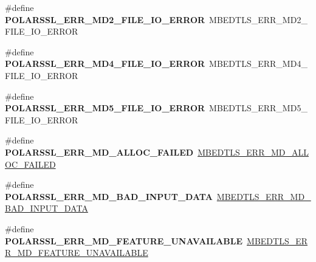 \begin{DoxyCompactItemize}
\mbox{\label{compat-1_83_8h_aaffd197bfef6b96a28efc3631c60ef48}} 
\#define {\bfseries P\+O\+L\+A\+R\+S\+S\+L\+\_\+\+E\+R\+R\+\_\+\+M\+D2\+\_\+\+F\+I\+L\+E\+\_\+\+I\+O\+\_\+\+E\+R\+R\+OR}~M\+B\+E\+D\+T\+L\+S\+\_\+\+E\+R\+R\+\_\+\+M\+D2\+\_\+\+F\+I\+L\+E\+\_\+\+I\+O\+\_\+\+E\+R\+R\+OR
\item 
\mbox{\label{compat-1_83_8h_a585cf248c4d1f41f682630c551c6f69c}} 
\#define {\bfseries P\+O\+L\+A\+R\+S\+S\+L\+\_\+\+E\+R\+R\+\_\+\+M\+D4\+\_\+\+F\+I\+L\+E\+\_\+\+I\+O\+\_\+\+E\+R\+R\+OR}~M\+B\+E\+D\+T\+L\+S\+\_\+\+E\+R\+R\+\_\+\+M\+D4\+\_\+\+F\+I\+L\+E\+\_\+\+I\+O\+\_\+\+E\+R\+R\+OR
\item 
\mbox{\label{compat-1_83_8h_ad26d8bd0d71d0fe8afaff96ec69c04fc}} 
\#define {\bfseries P\+O\+L\+A\+R\+S\+S\+L\+\_\+\+E\+R\+R\+\_\+\+M\+D5\+\_\+\+F\+I\+L\+E\+\_\+\+I\+O\+\_\+\+E\+R\+R\+OR}~M\+B\+E\+D\+T\+L\+S\+\_\+\+E\+R\+R\+\_\+\+M\+D5\+\_\+\+F\+I\+L\+E\+\_\+\+I\+O\+\_\+\+E\+R\+R\+OR
\item 
\mbox{\label{compat-1_83_8h_ad767a78d57c228eee2917bc5ffd8096c}} 
\#define {\bfseries P\+O\+L\+A\+R\+S\+S\+L\+\_\+\+E\+R\+R\+\_\+\+M\+D\+\_\+\+A\+L\+L\+O\+C\+\_\+\+F\+A\+I\+L\+ED}~\mbox{\hyperlink{md_8h_a7e7a4f1a618afbb412ef82ca2e572140}{M\+B\+E\+D\+T\+L\+S\+\_\+\+E\+R\+R\+\_\+\+M\+D\+\_\+\+A\+L\+L\+O\+C\+\_\+\+F\+A\+I\+L\+ED}}
\item 
\mbox{\label{compat-1_83_8h_ab5508cadb87f35ff11cd08a1a06f227f}} 
\#define {\bfseries P\+O\+L\+A\+R\+S\+S\+L\+\_\+\+E\+R\+R\+\_\+\+M\+D\+\_\+\+B\+A\+D\+\_\+\+I\+N\+P\+U\+T\+\_\+\+D\+A\+TA}~\mbox{\hyperlink{md_8h_aeeb355bf3d3d39a2a6ba50544139b9a7}{M\+B\+E\+D\+T\+L\+S\+\_\+\+E\+R\+R\+\_\+\+M\+D\+\_\+\+B\+A\+D\+\_\+\+I\+N\+P\+U\+T\+\_\+\+D\+A\+TA}}
\item 
\mbox{\label{compat-1_83_8h_ab39743e52520134a277e9141a6098e3e}} 
\#define {\bfseries P\+O\+L\+A\+R\+S\+S\+L\+\_\+\+E\+R\+R\+\_\+\+M\+D\+\_\+\+F\+E\+A\+T\+U\+R\+E\+\_\+\+U\+N\+A\+V\+A\+I\+L\+A\+B\+LE}~\mbox{\hyperlink{md_8h_a121b228f0512def159e3bd4ced07633b}{M\+B\+E\+D\+T\+L\+S\+\_\+\+E\+R\+R\+\_\+\+M\+D\+\_\+\+F\+E\+A\+T\+U\+R\+E\+\_\+\+U\+N\+A\+V\+A\+I\+L\+A\+B\+LE}}
\item 
\mbox{\label{compat-1_83_8h_a6a5aabd94dcc264d8a2e4e335eb995c9}} 

\end{DoxyCompactItemize}
